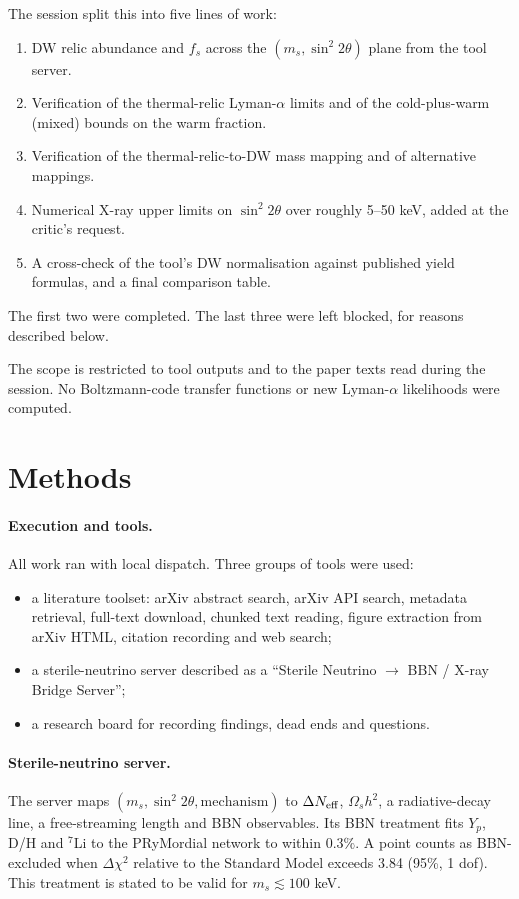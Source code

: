 \documentclass[11pt,a4paper]{article}
\begin{document}
The session split this into five lines of work:
\begin{enumerate}
\item DW relic abundance and $f_s$ across the $(m_s,\sin^2 2\theta)$ plane from the tool server.
\item Verification of the thermal-relic Lyman-$\alpha$ limits and of the cold-plus-warm (mixed) bounds on the warm fraction.
\item Verification of the thermal-relic-to-DW mass mapping and of alternative mappings.
\item Numerical X-ray upper limits on $\sin^2 2\theta$ over roughly 5--50 keV, added at the critic's request.
\item A cross-check of the tool's DW normalisation against published yield formulas, and a final comparison table.
\end{enumerate}
The first two were completed. The last three were left blocked, for reasons described below.

The scope is restricted to tool outputs and to the paper texts read during the session. No Boltzmann-code transfer functions or new Lyman-$\alpha$ likelihoods were computed.

\section{Methods}
\paragraph{Execution and tools.}
All work ran with local dispatch. Three groups of tools were used:
\begin{itemize}
\item a literature toolset: arXiv abstract search, arXiv API search, metadata retrieval, full-text download, chunked text reading, figure extraction from arXiv HTML, citation recording and web search;
\item a sterile-neutrino server described as a ``Sterile Neutrino $\to$ BBN / X-ray Bridge Server'';
\item a research board for recording findings, dead ends and questions.
\end{itemize}

\paragraph{Sterile-neutrino server.}
The server maps $(m_s,\sin^2 2\theta,\text{mechanism})$ to $\Delta N_{\rm eff}$, $\Omega_s h^2$, a radiative-decay line, a free-streaming length and BBN observables. Its BBN treatment fits $Y_p$, D/H and $^7$Li to the PRyMordial network to within $0.3\%$. A point counts as BBN-excluded when $\Delta\chi^2$ relative to the Standard Model exceeds 3.84 (95\%, 1 dof). This treatment is stated to be valid for $m_s\lesssim 100$ keV.
\end{document}
